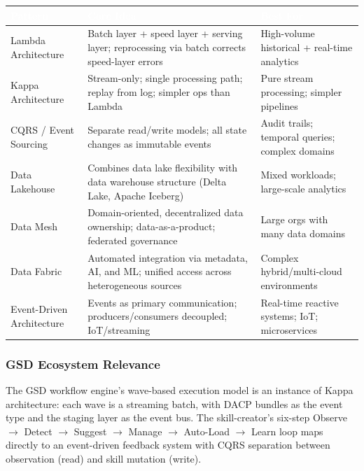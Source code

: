 \documentclass[11pt,letterpaper]{article}
\newcommand{\tableheader}[1]{\textbf{\sffamily\textcolor{white}{#1}}}
\begin{document}
\begin{center}
\begin{tabularx}{\textwidth}{L{3cm}XL{3.5cm}}
\toprule
{}
\tableheader{Pattern} & \tableheader{Core Idea} & \tableheader{Best For} \\
\midrule
Lambda Architecture & Batch layer + speed layer + serving layer; reprocessing via batch corrects speed-layer errors & High-volume historical + real-time analytics \\
Kappa Architecture & Stream-only; single processing path; replay from log; simpler ops than Lambda & Pure stream processing; simpler pipelines \\
CQRS / Event Sourcing & Separate read/write models; all state changes as immutable events & Audit trails; temporal queries; complex domains \\
Data Lakehouse & Combines data lake flexibility with data warehouse structure (Delta Lake, Apache Iceberg) & Mixed workloads; large-scale analytics \\
Data Mesh & Domain-oriented, decentralized data ownership; data-as-a-product; federated governance & Large orgs with many data domains \\
Data Fabric & Automated integration via metadata, AI, and ML; unified access across heterogeneous sources & Complex hybrid/multi-cloud environments \\
Event-Driven Architecture & Events as primary communication; producers/consumers decoupled; IoT/streaming & Real-time reactive systems; IoT; microservices \\
\bottomrule
\end{tabularx}
\end{center}

\subsubsection{GSD Ecosystem Relevance}

The GSD workflow engine's wave-based execution model is an instance of Kappa architecture: each wave is a streaming batch, with DACP bundles as the event type and the staging layer as the event bus. The skill-creator's six-step Observe $\rightarrow$ Detect $\rightarrow$ Suggest $\rightarrow$ Manage $\rightarrow$ Auto-Load $\rightarrow$ Learn loop maps directly to an event-driven feedback system with CQRS separation between observation (read) and skill mutation (write).

\end{document}
